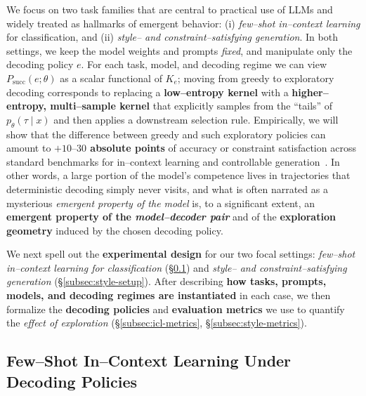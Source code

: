 We focus on two task families that are central to practical use
of LLMs and widely treated as hallmarks of emergent behavior:
(i) \emph{few--shot in--context learning} for classification, and
(ii) \emph{style-- and constraint--satisfying generation}.
In both settings, we keep the model weights and prompts \emph{fixed}, and
manipulate only the decoding policy $e$.
For each task, model, and decoding regime we can view $P_{\text{succ}}(e;\theta)$
as a scalar functional of $K_e$; moving from greedy to exploratory decoding
corresponds to replacing a \textbf{low--entropy kernel} with a \textbf{higher--entropy,
multi--sample kernel} that explicitly samples from the ``tails'' of
$p_\theta(\tau\mid x)$ and then applies a downstream selection rule.
Empirically, we will show that the difference between greedy and such exploratory
policies can amount to \textbf{$+10\text{--}30$ absolute points} of accuracy or
constraint satisfaction across standard benchmarks for in--context learning and
controllable generation~\citep{brown2020language,wei2022emergent,rao2018gyafc,
fan2018controllable,he2020ctrlsum,chan2021constrained}.
In other words, a large portion of the model's competence lives in trajectories that
deterministic decoding simply never visits, and what is often narrated as a mysterious
\emph{emergent property of the model} is, to a significant extent, an
\textbf{emergent property of the \emph{model--decoder pair}} and of the
\textbf{exploration geometry} induced by the chosen decoding policy.

We next spell out the \textbf{experimental design} for our two focal settings:
\emph{few--shot in--context learning for classification}
(\S\ref{subsec:icl-setup}) and \emph{style-- and constraint--satisfying generation}
(\S\ref{subsec:style-setup}).
After describing \textbf{how tasks, prompts, models, and decoding regimes are instantiated}
in each case, we then formalize the \textbf{decoding policies} and
\textbf{evaluation metrics} we use to quantify the \emph{effect of exploration}
(\S\ref{subsec:icl-metrics}, \S\ref{subsec:style-metrics}).



\subsection{Few--Shot In--Context Learning Under Decoding Policies}
\label{subsec:icl-setup}

